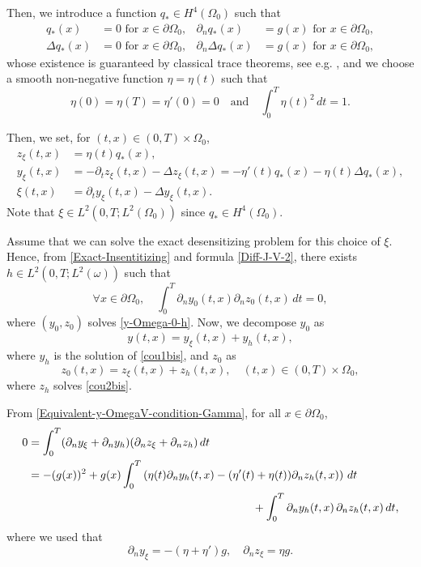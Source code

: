 \documentclass[JEP,XML,SOM,Unicode,NoFloatCountersInSection]{cedram}
\theoremstyle{definition}
\begin{document}
Then, we introduce a function $q_* \in H^4(\Omega_0)$ such that
\begin{align*}
q_* (x) &= 0\text{ for } x \in \partial \Omega_0,
&\partial_n q_* (x) &= g(x)\text{ for } x \in \partial \Omega_0,
\\
\Delta q_* (x) &= 0\text{ for } x \in \partial \Omega_0,
&\partial_n \Delta q_* (x) &= g(x)\text{ for } x \in \partial \Omega_0,
\end{align*}
whose existence is guaranteed by classical trace theorems, see e.g. \cite[Chap.\,1, Th.\,8.3]{LionsMagenes}, and we choose a smooth non-negative function $\eta = \eta(t)$ such that
\[
\eta(0) = \eta(T) =\eta'(0) = 0\quad\text{and}\quad\int_0^T \eta(t)^2 \, dt = 1.
\]

Then, we set, for $(t,x) \in (0,T) \times \Omega_0$,
\begin{align*}
z_\xi(t,x) &= \eta(t) q_*(x),\\
y_\xi(t,x) &= {- \partial_t z_\xi(t,x) - \Delta z_\xi(t,x)}
= - \eta'(t) q_*(x) - \eta(t) \Delta q_*(x),
\\
\xi(t,x) &= \partial_t y_\xi(t,x) - \Delta y_\xi(t,x).
\end{align*}
{Note that $\xi \in L^2(0,T; L^2(\Omega_0))$ since $q_* \in H^4(\Omega_0)$.}

Assume that we can solve the exact desensitizing problem for this choice of $\xi$. Hence, from \eqref{Exact-Insentitizing} and formula \eqref{Diff-J-V-2}, there exists $h \in L^2(0,T; L^2(\omega))$ such that
\begin{equation}
\label{Equivalent-y-OmegaV-condition-Gamma}
\forall x \in \partial \Omega_0, \quad \int_0^T \partial_n y_0(t,x) \partial_n z_0(t,x) \, dt = 0,
\end{equation}
where $(y_0, z_0)$ solves \eqref{y-Omega-0-h}.
Now, we decompose $y_0$ as
\begin{equation*}
y(t,x) = y_\xi (t,x) + y_h(t,x),
\end{equation*}
where $y_h$ is the solution of \eqref{cou1bis}, and $z_0$ as
\begin{equation*}
z_0(t,x) = z_\xi(t,x) + z_h(t,x), \quad (t,x) \in (0,T) \times \Omega_0,
\end{equation*}
where $z_h$ solves \eqref{cou2bis}.

From \eqref{Equivalent-y-OmegaV-condition-Gamma}, for all $x \in \partial \Omega_0$,
\begin{align*}
0 &= \int_0^T (\partial_n y_\xi + \partial_n y_h) (\partial_n z_\xi + \partial_n z_h) \, dt
\\
&=
- (g(x))^2 + g(x) \int_0^T \left(\eta(t) \partial_n y_h(t,x) - (\eta' (t)+ \eta(t)) \partial_n z_h(t,x) \right) \, dt\\
&\hspace*{7cm}+ \int_0^T \partial_n y_h(t,x)\, \partial_n z_h(t,x) \, dt,
\end{align*}
where we used that
\[
\partial_n y_\xi = - (\eta + \eta') g, \quad \partial_n z_\xi = \eta g.
\]
\end{document}
